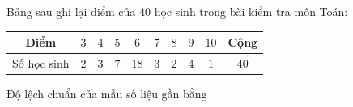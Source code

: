 \begin{ex}
Bảng sau ghi lại điểm của $40$ học sinh trong bài kiểm tra môn Toán:
\begin{center}
\begin{tabular}{|c|c|c|c|c|c|c|c|c|c|}\hline
Điểm & $3$ & $4$ & $5$ & $6$ & $7$ & $8$ & $9$ & $10$ & Cộng\\\hline
Số học sinh & $2$ & $3$ & $7$ & $18$ & $3$ & $2$ & $4$ & $1$ & $40$\\\hline
\end{tabular}
\end{center}
Độ lệch chuẩn của mẫu số liệu gần bằng
\end{ex}
